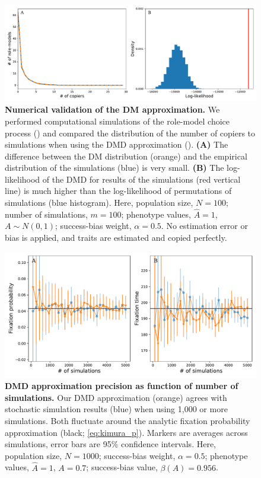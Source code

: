\documentclass[12pt]{extarticle}
\begin{document}
\begin{figure}[h]
    \includegraphics[width=\linewidth]{DM_validation.pdf}
  \caption{
  \textbf{Numerical validation of the DM approximation.}
  We performed computational simulations of the role-model choice process () and compared the distribution of the number of copiers to simulations when using the DMD approximation ().
  \textbf{(A)} The difference between the DM distribution (orange) and the empirical distribution of the simulations (blue) is very small. 
  \textbf{(B)} The log-likelihood of the DMD for results of the simulations (red vertical line) is much higher {than} the log-likelihood of permutations of simulations (blue histogram).
  Here, population size, $N=100$; number of simulations, $m=100$; phenotype values, $\hat{A}=1$, $A \sim N(0,1)$; success-bias weight, $\alpha=0.5$.
  No estimation error or bias is applied, and traits are estimated and copied perfectly.}	
  \label{fig:DM_validation}
\end{figure}


\begin{figure}[h]
    \includegraphics[width=\linewidth]{num_sims.pdf}
  \caption{
  \textbf{DMD approximation precision as function of number of simulations.}
  Our DMD approximation (orange) agrees with stochastic simulation results (blue) when using 1,000 or more simulations.
  Both fluctuate around the analytic fixation probability approximation (black; \cref{eq:kimura_p}).
  Markers are averages across simulations, error bars are 95\% confidence intervals.
  Here, population size, $N=1000$; success-bias weight, $\alpha=0.5$; phenotype values, $\hat{A}=1$, $A=0.7$; success-bias value, $\beta(A)=0.956$.}	
  \label{fig:num_sims}
\end{figure}
\end{document}
